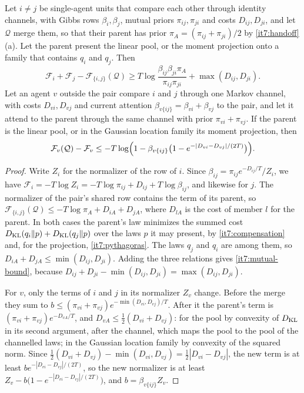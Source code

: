 \documentclass[11pt,letterpaper]{report}
\begin{document}
Let $i\ne j$ be single-agent units that compare each other through identity channels, with Gibbs rows $\beta_i,\beta_j$, mutual priors $\pi_{ij},\pi_{ji}$ and costs $D_{ij},D_{ji}$, and let $\mathcal Q$ merge them, so that their parent has prior $\pi_A=(\pi_{ij}+\pi_{ji})/2$ by \cref{it7:handoff}(a). Let the parent present the linear pool, or the moment projection onto a family that contains $q_i$ and $q_j$. Then
\begin{equation}
\mathcal F_i+\mathcal F_j-\mathcal F_{\{i,j\}}(\mathcal Q)\ge T\log\frac{\beta_{ij}\beta_{ji}\pi_A}{\pi_{ij}\pi_{ji}}+\max(D_{ij},D_{ji}).
\label{it7:mutual-bound}
\end{equation}
Let an agent $v$ outside the pair compare $i$ and $j$ through one Markov channel, with costs $D_{vi},D_{vj}$ and current attention $\beta_{v\{ij\}}=\beta_{vi}+\beta_{vj}$ to the pair, and let it attend to the parent through the same channel with prior $\pi_{vi}+\pi_{vj}$. If the parent is the linear pool, or in the Gaussian location family its moment projection, then
\begin{equation}
\mathcal F_v(\mathcal Q)-\mathcal F_v\le-T\log\Bigl(1-\beta_{v\{ij\}}\bigl(1-e^{-|D_{vi}-D_{vj}|/(2T)}\bigr)\Bigr).
\label{it7:outsider-bound}
\end{equation}
\begin{proof}
Write $Z_i$ for the normalizer of the row of $i$. Since $\beta_{ij}=\pi_{ij}e^{-D_{ij}/T}/Z_i$, we have $\mathcal F_i=-T\log Z_i=-T\log\pi_{ij}+D_{ij}+T\log\beta_{ij}$, and likewise for $j$. The normalizer of the pair's shared row contains the term of its parent, so $\mathcal F_{\{i,j\}}(\mathcal Q)\le-T\log\pi_A+D_{iA}+D_{jA}$, where $D_{lA}$ is the cost of member $l$ for the parent. In both cases the parent's law minimizes the summed cost $D_{\mathrm{KL}}(q_i\Vert p)+D_{\mathrm{KL}}(q_j\Vert p)$ over the laws $p$ it may present, by \cref{it7:compensation} and, for the projection, \cref{it7:pythagoras}. The laws $q_j$ and $q_i$ are among them, so $D_{iA}+D_{jA}\le\min(D_{ij},D_{ji})$. Adding the three relations gives \cref{it7:mutual-bound}, because $D_{ij}+D_{ji}-\min(D_{ij},D_{ji})=\max(D_{ij},D_{ji})$.

For $v$, only the terms of $i$ and $j$ in its normalizer $Z_v$ change. Before the merge they sum to $b\le(\pi_{vi}+\pi_{vj})e^{-\min(D_{vi},D_{vj})/T}$. After it the parent's term is $(\pi_{vi}+\pi_{vj})e^{-D_{vA}/T}$, and $D_{vA}\le\frac12(D_{vi}+D_{vj})$: for the pool by convexity of $D_{\mathrm{KL}}$ in its second argument, after the channel, which maps the pool to the pool of the channelled laws; in the Gaussian location family by convexity of the squared norm. Since $\frac12(D_{vi}+D_{vj})-\min(D_{vi},D_{vj})=\frac12|D_{vi}-D_{vj}|$, the new term is at least $be^{-|D_{vi}-D_{vj}|/(2T)}$, so the new normalizer is at least $Z_v-b\bigl(1-e^{-|D_{vi}-D_{vj}|/(2T)}\bigr)$, and $b=\beta_{v\{ij\}}Z_v$.
\end{proof}
\end{document}
